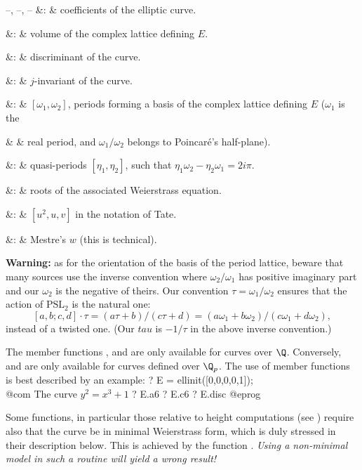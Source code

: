 \+ --, --, -- &: &
coefficients of the elliptic curve.\cr

\+  &: &  volume of the complex lattice defining $E$.\cr

\+  &: & discriminant of the curve.\cr

\+     &: & $j$-invariant of the curve.\cr

\+ &: & $[\omega_1,\omega_2]$, periods forming a basis of
the complex lattice defining $E$ ($\omega_1$ is the\cr

\+            &   & real period, and $\omega_1/\omega_2$ belongs to
Poincar\'e's half-plane).\cr

\+   &: & quasi-periods $[\eta_1, \eta_2]$, such that
$\eta_1\omega_2-\eta_2\omega_1=2i\pi$.\cr

\+ &: & roots of the associated Weierstrass equation.\cr

\+  &: & $[u^2,u,v]$ in the notation of Tate.\cr

\+  &: & Mestre's $w$ (this is technical).\cr

\noindent
{\bf Warning:} as for the orientation of the basis of the period lattice,
beware that many sources use the inverse convention where $\omega_2/\omega_1$
has positive imaginary part and our $\omega_2$ is the negative of theirs. Our
convention $\tau = \omega_1/\omega_2$  ensures that the action of $\text{PSL}_2$ is the natural
one:
$$[a,b;c,d]\cdot\tau = (a\tau+b)/(c\tau+d)
  = (a \omega_1 + b\omega_2)/(c\omega_1 + d\omega_2),$$
instead of a twisted one. (Our $tau$ is $-1/\tau$ in the above inverse
convention.)

The member functions ,  and  are only available
for curves over $\Q$. Conversely,  and  are only available
for curves defined over $\Q_p$. The use of member functions is best described
by an example:
\bprog
  ? E = ellinit([0,0,0,0,1]); \\@com The curve $y^2 = x^3 + 1$
  ? E.a6
  ? E.c6
  ? E.disc
@eprog
\smallskip

Some functions, in particular those relative to height computations (see
) require also that the curve be in minimal Weierstrass
form, which is duly stressed in their description below. This is achieved by
the function . \emph{Using a non-minimal model in such a
routine will yield a wrong result!}

